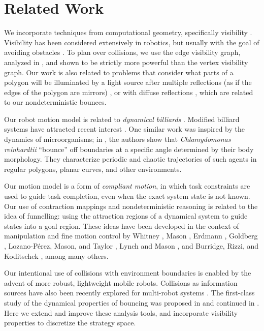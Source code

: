 \documentclass[]{styles/svproc}  %
\begin{document}
\section{Related Work}

We incorporate techniques from computational geometry, specifically visibility
\cite{ghosh2007visibility}. Visibility has been considered extensively in
robotics, but usually with the goal of avoiding obstacles
\cite{lozano1979algorithm,SimLauNis00}. To plan over collisions, we use the edge
visibility graph, analyzed in \cite{rourke_viz}, and shown to be strictly more
powerful than the vertex visibility graph. Our work is also related to problems
that consider what parts of a polygon will be illuminated by a light source
after multiple reflections (as if the edges of the polygon are mirrors)
\cite{Aronov1996}, or with diffuse reflections \cite{prasad1998visibility},
which are related to our nondeterministic bounces.

Our robot motion model is related to
\emph{dynamical billiards} \cite{billiards}. Modified billiard systems have attracted recent interest
\cite{DelMagno2014,pinball,billiards}. One similar work was inspired by the
dynamics of microorganisms; in \cite{microorganism2017}, the authors show that
\textit{Chlamydomonas reinhardtii} ``bounce'' off boundaries at a specific
angle determined by their body morphology. They characterize periodic and
chaotic trajectories of such agents in regular polygons, planar curves, and
other environments.

Our motion model is a
form of \emph{compliant motion}, in which task constraints are used to guide task
completion, even when the exact system state is not known. Our use of
contraction mappings and nondeterministic reasoning is
related to the idea of funnelling: using
the attraction regions of a dynamical system to guide states into a goal region.
These ideas have been developed in the context of manipulation and fine motion control by Whitney
\cite{Whi77}, Mason \cite{Mas85}, Erdmann
\cite{Erd86}, Goldberg \cite{Gol93}, Lozano-P{\'e}rez, Mason, and Taylor
\cite{LozMasTay84}, Lynch and Mason \cite{LynMas95}, and Burridge, Rizzi, and Koditschek
\cite{BurRizKod99}, among many others.

Our intentional use of collisions with
environment boundaries is enabled by the advent of more robust, lightweight mobile
robots. Collisions as information sources have also been
recently explored for multi-robot systems \cite{mayya2018localization}.
The first-class study of the dynamical properties of bouncing was proposed in
\cite{ErLav13} and continued in \cite{NilBecLav17}. Here we extend and improve
these analysis tools, and incorporate visibility properties to
discretize the strategy space.
\end{document}
